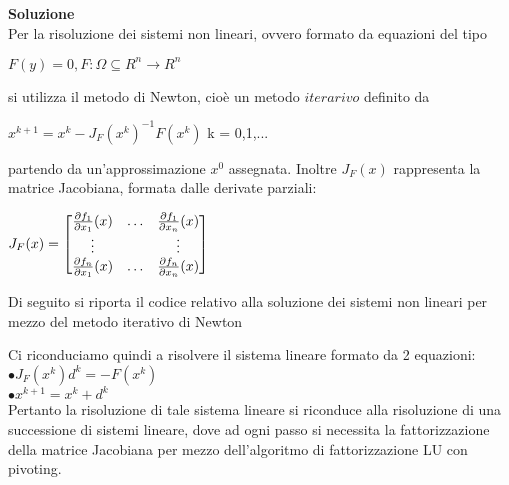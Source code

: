 \large\noindent{}
\begin{flushleft}
	\large \textbf{Soluzione}\\[0.5cm]
	Per la risoluzione dei sistemi non lineari, ovvero formato da equazioni del tipo
	\begin{center}$F(y) = 0, F:\Omega \subseteq R^{n} \rightarrow R^{n}$ \end{center}
	 si utilizza il metodo di Newton, cioè un metodo $iterarivo$ definito da\\[0.2cm]
	\begin{center} $x^{k+1} = x^{k} - J_{F}(x^{k})^{-1}F(x^{k})$    k = 0,1,...\\[0.2cm]\end{center}
	partendo da un'approssimazione $x^{0}$ assegnata. Inoltre $J_{F}(x)$ rappresenta la matrice Jacobiana, formata dalle derivate parziali:\\[0.5cm]
	\begin{center}
	$J_{F}(x) = \begin{bmatrix}
				\frac{\partial f_{1}}{\partial x_{1}}(x) & \ldots  & \frac{\partial f_{1}}{\partial x_{n}}(x)\\
				\vdots & \space & \vdots \\
				\frac{\partial f_{n}}{\partial x_{1}}(x) & \ldots  & \frac{\partial f_{n}}{\partial x_{n}}(x)
			\end{bmatrix}$
			\end{center}
			Di seguito si riporta il codice relativo alla soluzione dei sistemi non lineari per mezzo del metodo iterativo di Newton
			
			Ci riconduciamo quindi a risolvere il sistema lineare formato da 2 equazioni:\\
			$\bullet J_{F}(x^{k})d^{k} = -F(x^{k})$\\[0.2cm]
			$\bullet x^{k+1} = x^{k} + d^{k}$\\[0.5cm]
			Pertanto la risoluzione di tale sistema lineare si riconduce alla risoluzione di una successione di sistemi lineare, dove ad ogni passo si necessita la fattorizzazione della matrice Jacobiana per mezzo dell'algoritmo di fattorizzazione LU con pivoting.
	\end{flushleft} 